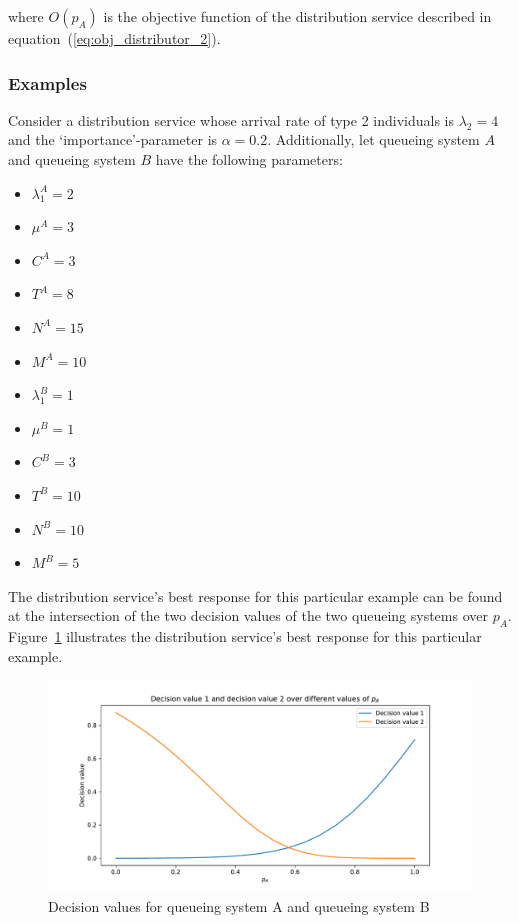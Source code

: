 where \(O(p_A)\) is the objective function of the distribution service described
in equation~(\ref{eq:obj_distributor_2}).

\subsubsection{Examples}\label{sec:brent_method_example}
Consider a distribution service whose arrival rate of type 2 individuals is
\(\lambda_2 = 4\) and the `importance'-parameter is \(\alpha = 0.2\).
Additionally, let queueing system \(A\) and queueing system \(B\) have the
following parameters:

\begin{multicols}{2}
    \begin{itemize}
        \item \(\lambda_1^A = 2\)
        \item \(\mu^A = 3\)
        \item \(C^A = 3\)
        \item \(T^A = 8\)
        \item \(N^A = 15\)
        \item \(M^A = 10\)
        \item \(\lambda_1^B = 1\)
        \item \(\mu^B = 1\)
        \item \(C^B = 3\)
        \item \(T^B = 10\)
        \item \(N^B = 10\)
        \item \(M^B = 5\)
    \end{itemize}
\end{multicols}

The distribution service's best response for this particular example can be
found at the intersection of the two decision values of the two queueing
systems over \(p_A\).
Figure~\ref{fig:brent_method_example} illustrates the distribution service's
best response for this particular example.

\begin{figure}[H]
    \centering
    \includegraphics[width=\textwidth]{chapters/04_game_theoretic_model/img/brents_method/brent_method_example.pdf}
    \caption{Decision values for queueing system A and queueing system B}
    \label{fig:brent_method_example}
\end{figure}

